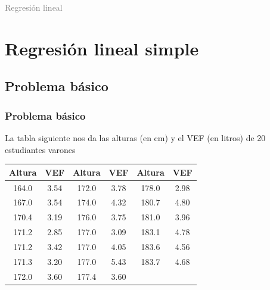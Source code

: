 \documentclass[12pt,t]{beamer}
\title[\red{Bioestadística}]{}
\author[]{Cesc Rosselló}
\date{}
\newcommand{\gray}[1]{\textcolor{gray}{#1}}
\theoremstyle{plain}
\theoremstyle{definition}
\begin{document}
\beamertemplatedotitem



\begin{frame}
\vfill
\begin{center}
\gray{\LARGE Regresión lineal}
\end{center}
\vfill
\end{frame}



\section{Regresión lineal simple}
\subsection{Problema básico}

\begin{frame}
\frametitle{Problema básico}

La tabla siguiente nos da las alturas (en cm) y el VEF (en litros) de 20 estudiantes varones\medskip

\begin{center}
\begin{tabular}{cc|cc|cc}
Altura & VEF & Altura & VEF &Altura & VEF \\\hline
164.0 & 3.54 & 172.0 & 3.78 & 178.0 & 2.98\\
167.0 & 3.54 & 174.0 & 4.32 & 180.7 & 4.80\\
170.4 & 3.19 & 176.0 & 3.75 & 181.0 & 3.96\\
171.2 & 2.85 & 177.0 & 3.09 & 183.1 & 4.78\\
171.2 & 3.42 & 177.0 & 4.05 & 183.6 & 4.56\\
171.3 & 3.20 & 177.0 & 5.43 & 183.7 & 4.68\\
172.0 & 3.60 & 177.4 & 3.60
\end{tabular}
\end{center}
\end{frame}



%
\end{document}
